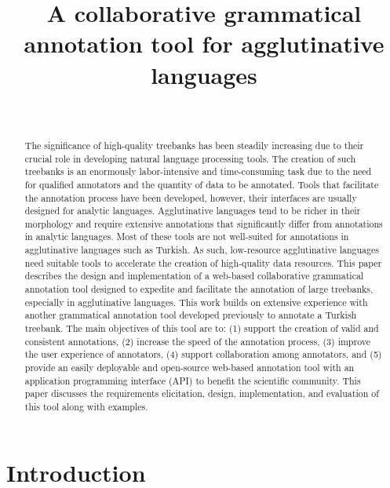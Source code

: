 \documentclass{elektr}
\title{A collaborative grammatical annotation tool for agglutinative languages}
\author[]{
\textbf{}\\

\rec{.202}
\acc{.202}
\finv{..202}
}
\begin{document}
\maketitle

% 
\begin{abstract}
The significance of high-quality treebanks has been steadily increasing due to their crucial role in developing natural language processing tools.
The creation of such treebanks is an enormously labor-intensive and time-consuming task due to the need for qualified annotators and the quantity of data to be annotated.
Tools that facilitate the annotation process have been developed, however, their interfaces are usually designed for analytic languages.
Agglutinative languages tend to be richer in their morphology and require extensive annotations that significantly differ from annotations in analytic languages.
Most of these tools are not well-suited for annotations in agglutinative languages such as Turkish.
As such, low-resource agglutinative languages need suitable tools to accelerate the creation of high-quality data resources.
This paper describes the design and implementation of a web-based collaborative grammatical annotation tool designed to expedite and facilitate the annotation of large treebanks, especially in agglutinative languages.
This work builds on extensive experience with another grammatical annotation tool developed previously to annotate a Turkish treebank.
The main objectives of this tool are to: (1) support the creation of valid and consistent annotations, (2) increase the speed of the annotation process, (3) improve the user experience of annotators, (4) support collaboration among annotators, and (5) provide an easily deployable and open-source web-based annotation tool with an application programming interface (API) to benefit the scientific community.
This paper discusses the requirements elicitation, design, implementation, and evaluation of this tool along with examples.


\end{abstract}    

% 
\section{Introduction}
\label{sec:introduction}
\end{document}
